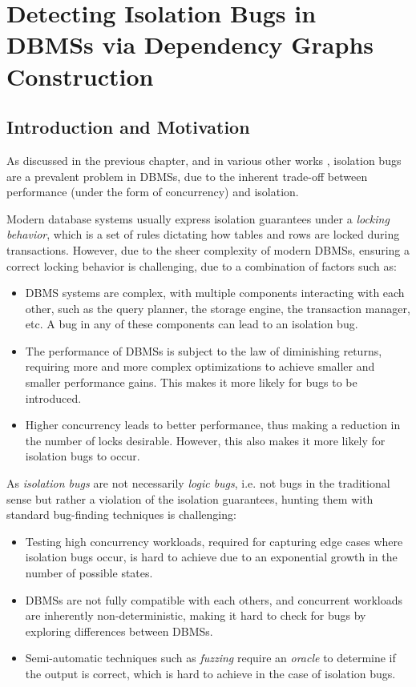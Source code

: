 \chapter{Detecting Isolation Bugs in DBMSs via Dependency Graphs Construction}

\section{Introduction and Motivation}

As discussed in the previous chapter, and in various other works \cite{jiang2023detecting,cui2024understanding_ICSE2024,dou2023detecting_ICSE2023,clark2024validating,cui2022differentially_ASE2022}, isolation bugs are a prevalent problem in DBMSs, due to the inherent trade-off between performance (under the form of concurrency) and isolation.

Modern database systems usually express isolation guarantees under a \textit{locking behavior}, which is a set of rules dictating how tables and rows are locked during transactions. However, due to the sheer complexity of modern DBMSs, ensuring a correct locking behavior is challenging, due to a combination of factors such as:

\begin{itemize}
    \item DBMS systems are complex, with multiple components interacting with each other, such as the query planner, the storage engine, the transaction manager, etc. A bug in any of these components can lead to an isolation bug.
    \item The performance of DBMSs is subject to the law of diminishing returns, requiring more and more complex optimizations to achieve smaller and smaller performance gains. This makes it more likely for bugs to be introduced.
    \item Higher concurrency leads to better performance, thus making a reduction in the number of locks desirable. However, this also makes it more likely for isolation bugs to occur.
\end{itemize}

As \textit{isolation bugs} are not necessarily \textit{logic bugs}, i.e. not bugs in the traditional sense but rather a violation of the isolation guarantees, hunting them with standard bug-finding techniques is challenging:

\begin{itemize}
    \item Testing high concurrency workloads, required for capturing edge cases where isolation bugs occur, is hard to achieve due to an exponential growth in the number of possible states.
    \item DBMSs are not fully compatible with each others, and concurrent workloads are inherently non-deterministic, making it hard to check for bugs by exploring differences between DBMSs.
    \item Semi-automatic techniques such as \textit{fuzzing} require an \textit{oracle} to determine if the output is correct, which is hard to achieve in the case of isolation bugs.
\end{itemize}

